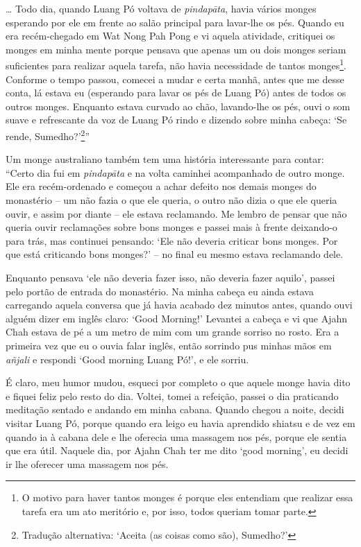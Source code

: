 \ldots{} Todo dia, quando Luang Pó voltava de \emph{pindapāta}, havia
vários monges esperando por ele em frente ao salão principal para
lavar-lhe os pés. Quando eu era recém-chegado em Wat Nong Pah Pong e vi
aquela atividade, critiquei os monges em minha mente porque pensava que
apenas um ou dois monges seriam suficientes para realizar aquela tarefa,
não havia necessidade de tantos monges\footnote{O motivo para haver
  tantos monges é porque eles entendiam que realizar essa tarefa era um
  ato meritório e, por isso, todos queriam tomar parte.}. Conforme o
tempo passou, comecei a mudar e certa manhã, antes que me desse conta,
lá estava eu (esperando para lavar os pés de Luang Pó) antes de todos os
outros monges. Enquanto estava curvado ao chão, lavando-lhe os pés, ouvi
o som suave e refrescante da voz de Luang Pó rindo e dizendo sobre minha
cabeça: `Se rende, Sumedho?'\footnote{Tradução alternativa: `Aceita (as
  coisas como são), Sumedho?'}''

Um monge australiano também tem uma história interessante para contar:
``Certo dia fui em \emph{pindapāta} e na volta caminhei acompanhado de
outro monge. Ele era recém-ordenado e começou a achar defeito nos demais
monges do monastério -- um não fazia o que ele queria, o outro não dizia
o que ele queria ouvir, e assim por diante -- ele estava reclamando. Me
lembro de pensar que não queria ouvir reclamações sobre bons monges e
passei mais à frente deixando-o para trás, mas continuei pensando: `Ele
não deveria criticar bons monges. Por que está criticando bons monges?'
-- no final eu mesmo estava reclamando dele.

Enquanto pensava `ele não deveria fazer isso, não deveria fazer aquilo',
passei pelo portão de entrada do monastério. Na minha cabeça eu ainda
estava carregando aquela conversa que já havia acabado dez minutos
antes, quando ouvi alguém dizer em inglês claro: `Good Morning!'
Levantei a cabeça e vi que Ajahn Chah estava de pé a um metro de mim com
um grande sorriso no rosto. Era a primeira vez que eu o ouvia falar
inglês, então sorrindo pus minhas mãos em \emph{añjali} e respondi `Good
morning Luang Pó!', e ele sorriu.

É claro, meu humor mudou, esqueci por completo o que aquele monge havia
dito e fiquei feliz pelo resto do dia. Voltei, tomei a refeição, passei
o dia praticando meditação sentado e andando em minha cabana. Quando
chegou a noite, decidi visitar Luang Pó, porque quando era leigo eu
havia aprendido shiatsu e de vez em quando ia à cabana dele e lhe
oferecia uma massagem nos pés, porque ele sentia que era útil. Naquele
dia, por Ajahn Chah ter me dito `good morning', eu decidi ir lhe
oferecer uma massagem nos pés.

